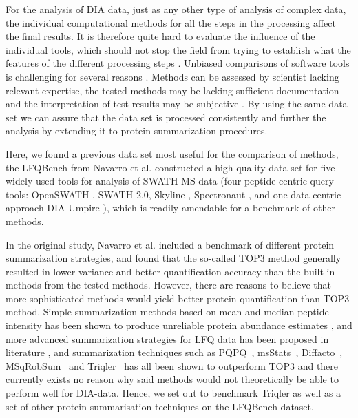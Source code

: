 \documentclass[10pt,letterpaper]{article}
\begin{document}
For the analysis of DIA data, just as any other type of analysis of complex data, the individual computational methods for all the steps in the processing affect the final results. It is therefore quite hard to evaluate the influence of the individual tools, which should not stop the field from trying to establish what the features of the different processing steps \cite{dufresne2014abrf,gatto2016testing,navarro2016multicenter}. Unbiased comparisons of software tools is challenging for several reasons \cite{dufresne2014abrf}. Methods can be assessed by scientist lacking relevant expertise, the tested methods may be lacking sufficient documentation and the interpretation of test results may be subjective \cite{yates2012toward} \cite{leprevost2014best} \cite{pak2013clustering} \cite{faircomparison2015}. By using the same data set we can assure that the data set is processed consistently and further the analysis by extending it to protein summarization procedures.

Here, we found a previous data set most useful for the comparison of methods, the LFQBench from Navarro et al. \cite{navarro2016multicenter} constructed a high-quality data set for five widely used tools for analysis of SWATH-MS data (four peptide-centric query tools: OpenSWATH \cite{rost2014openswath}, SWATH 2.0, Skyline \cite{maclean2010skyline}, Spectronaut \cite{bruderer2015extending}, and one data-centric approach DIA-Umpire \cite{maclean2010skyline}), which is readily amendable for a benchmark of other methods.

In the original study, Navarro et al. included a benchmark of different protein summarization strategies, and found that the so-called TOP3 method generally resulted in lower variance and better quantification accuracy than the built-in methods from the tested methods\cite{navarro2016multicenter}. However, there are reasons to believe that more sophisticated methods would yield better protein quantification than TOP3-method. Simple summarization methods based on mean and median peptide intensity has been shown to produce unreliable protein abundance estimates \cite{goeminne2015summarization}, and more advanced summarization strategies for LFQ data has been proposed in literature \cite{silva2006absolute,cox2014accurate}, and summarization techniques such as PQPQ~\cite{forshed2011enhanced}, msStats~\cite{choi2014msstats}, Diffacto~\cite{zhang2017covariation}, MSqRobSum~\cite{sticker2020robust} and Triqler~\cite{The2018Integrated} has all been shown to outperform TOP3 and there currently exists no reason why said methods would not theoretically be able to perform well for DIA-data. Hence, we set out to benchmark Triqler as well as a set of other protein summarisation techniques on the LFQBench dataset.
 
\end{document}
